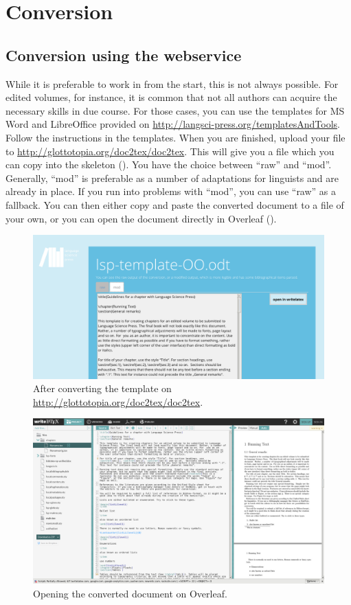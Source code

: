 \chapter{Conversion} 
\section{Conversion using the webservice}
While it is preferable to work in \latex from the start, this is not always possible. For edited volumes, for instance, it is common that not all authors can acquire the necessary skills in due course. For those cases, you can use the templates for MS Word and LibreOffice provided on \url{http://langsci-press.org/templatesAndTools}. Follow the instructions in the templates. When you are finished, upload your file to \url{http://glottotopia.org/doc2tex/doc2tex}. This will give you a file which you can copy into the skeleton (). You have the choice between ``raw'' and ``mod''. Generally,  ``mod'' is preferable as a number of adaptations for linguists and \lsp are already in place. If you run into problems with ``mod'', you can use  ``raw'' as a fallback. You can then either copy and paste the converted document to a file of your own, or you can open the document directly in Overleaf ().

\begin{figure}
\includegraphics[width=\textwidth]{converter.png} 
\caption{After converting the template on \url{http://glottotopia.org/doc2tex/doc2tex}.}
\label{fig:conversion:glottotopia}
\end{figure}

\begin{figure}
\includegraphics[width=\textwidth]{conversionwritelatex.png} 
\caption{Opening the converted document on Overleaf.}
\label{fig:conversion:overleaf}
\end{figure}

